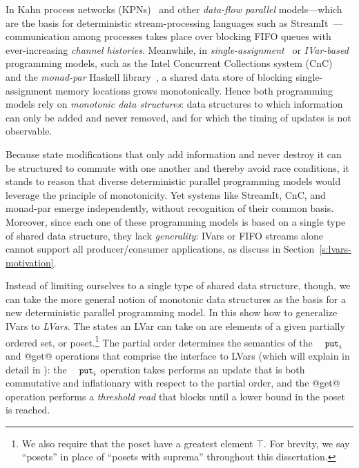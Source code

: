 In Kahn process networks (KPNs)~\cite{Kahn-1974} and other
\emph{data-flow parallel} models---which are the basis for
deterministic stream-processing languages such as
StreamIt~\cite{streamit-asplos}---communication among processes takes
place over blocking FIFO queues with ever-increasing \emph{channel
  histories}.  Meanwhile, in
\emph{single-assignment}~\cite{Tesler-1968} or
\emph{IVar-based}~\cite{IStructures} programming models, such as the
Intel Concurrent Collections system (CnC)~\cite{CnC} and the
\emph{monad-par} Haskell library~\cite{monad-par}, a shared data store
of blocking single-assignment memory locations grows monotonically.
Hence both programming models rely on \emph{monotonic data
structures}: data structures to which information can only be added
and never removed, and for which the timing of updates is not
observable.

Because state modifications that only add information and never
destroy it can be structured to commute with one another and thereby
avoid race conditions, it stands to reason that diverse deterministic
parallel programming models would leverage the principle of
monotonicity.  Yet systems like StreamIt, CnC, and monad-par emerge
independently, without recognition of their common basis.  Moreover,
since each one of these programming models is based on a single type
of shared data structure, they lack \emph{generality}: IVars or FIFO
streams alone cannot support all producer/consumer applications, as 
discuss in Section~\ref{s:lvars-motivation}.

Instead of limiting ourselves to a single type of shared data
structure, though, we can take the more general notion of monotonic
data structures as the basis for a new deterministic parallel
programming model.  In this  show how
to generalize IVars to \emph{LVars}.  The states an LVar can take on
are elements of a given partially ordered set, or poset.\footnote{We
also require that the poset have a greatest element $\top$.  For
brevity, we say ``posets'' in place of ``posets with suprema''
throughout this dissertation.}  The partial order determines the
semantics of the $\PUTi$ and @get@ operations that comprise the
interface to LVars (which  will explain in detail
in ): the
$\PUTi$ operation takes performs an update that is both commutative
and inflationary with respect to the partial order, and the @get@
operation performs a \emph{threshold read} that blocks until a lower
bound in the poset is reached.

